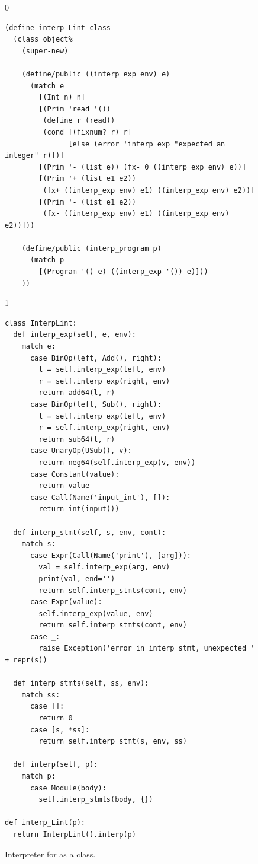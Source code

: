 \documentclass[7x10]{TimesAPriori_MIT}%
\def\racketEd{0}
\def\pythonEd{1}
\def\edition{1}
\newcommand{\pythonColor}[0]{}
\numberwithin{theorem}{chapter}
\numberwithin{definition}{chapter}
\numberwithin{equation}{chapter}
\begin{document}
\begin{figure}[tp]
\begin{tcolorbox}[colback=white]
{\if\edition\racketEd
\begin{lstlisting}
(define interp-Lint-class
  (class object%
    (super-new)
    
    (define/public ((interp_exp env) e)
      (match e
        [(Int n) n]
        [(Prim 'read '())
         (define r (read))
         (cond [(fixnum? r) r]
               [else (error 'interp_exp "expected an integer" r)])]
        [(Prim '- (list e)) (fx- 0 ((interp_exp env) e))]
        [(Prim '+ (list e1 e2))
         (fx+ ((interp_exp env) e1) ((interp_exp env) e2))]
        [(Prim '- (list e1 e2))
         (fx- ((interp_exp env) e1) ((interp_exp env) e2))]))

    (define/public (interp_program p)
      (match p
        [(Program '() e) ((interp_exp '()) e)]))
    ))
\end{lstlisting}
\fi}
{\if\edition\pythonEd\pythonColor
\begin{lstlisting}
class InterpLint:
  def interp_exp(self, e, env):
    match e:
      case BinOp(left, Add(), right):
        l = self.interp_exp(left, env)
        r = self.interp_exp(right, env)
        return add64(l, r)
      case BinOp(left, Sub(), right):
        l = self.interp_exp(left, env)
        r = self.interp_exp(right, env)
        return sub64(l, r)
      case UnaryOp(USub(), v):
        return neg64(self.interp_exp(v, env))
      case Constant(value):
        return value
      case Call(Name('input_int'), []):
        return int(input())            

  def interp_stmt(self, s, env, cont):
    match s:
      case Expr(Call(Name('print'), [arg])):
        val = self.interp_exp(arg, env)
        print(val, end='')
        return self.interp_stmts(cont, env)
      case Expr(value):
        self.interp_exp(value, env)
        return self.interp_stmts(cont, env)
      case _:
        raise Exception('error in interp_stmt, unexpected ' + repr(s))
    
  def interp_stmts(self, ss, env):
    match ss:
      case []:
        return 0
      case [s, *ss]:
        return self.interp_stmt(s, env, ss)

  def interp(self, p):
    match p:
      case Module(body):
        self.interp_stmts(body, {})

def interp_Lint(p):
  return InterpLint().interp(p)
\end{lstlisting}
\fi}
\end{tcolorbox}
\caption{Interpreter for \LangInt{} as a class.}
\label{fig:interp-Lint-class}
\end{figure}
\end{document}
